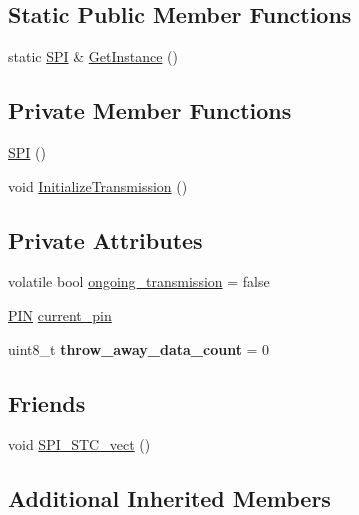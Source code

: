 \subsection*{Static Public Member Functions}
\begin{DoxyCompactItemize}
\item 
static \hyperlink{class_s_p_i___n_1_1_s_p_i}{S\+PI} \& \hyperlink{class_s_p_i___n_1_1_s_p_i_abc266ff9d817b8d4437d1da47fe8e7ae}{Get\+Instance} ()
\end{DoxyCompactItemize}
\subsection*{Private Member Functions}
\begin{DoxyCompactItemize}
\item 
\hyperlink{class_s_p_i___n_1_1_s_p_i_a8fec1a6e642a5758acf974b92e28a9e6}{S\+PI} ()
\item 
void \hyperlink{class_s_p_i___n_1_1_s_p_i_af973a5b4a970c3c01430037d578151ef}{Initialize\+Transmission} ()
\end{DoxyCompactItemize}
\subsection*{Private Attributes}
\begin{DoxyCompactItemize}
\item 
volatile bool \hyperlink{class_s_p_i___n_1_1_s_p_i_a89115bf64f31cd26d0b6ed3292decabb}{ongoing\+\_\+transmission} = false
\item 
\hyperlink{struct_s_p_i___n_1_1_p_i_n}{P\+IN} \hyperlink{class_s_p_i___n_1_1_s_p_i_ac016c4eaed2db3f8b5523bf0d472ddd2}{current\+\_\+pin}
\item 
\hypertarget{class_s_p_i___n_1_1_s_p_i_aaed8cc6f36275c3e33fcada1b9172742}{}\label{class_s_p_i___n_1_1_s_p_i_aaed8cc6f36275c3e33fcada1b9172742} 
uint8\+\_\+t {\bfseries throw\+\_\+away\+\_\+data\+\_\+count} = 0
\end{DoxyCompactItemize}
\subsection*{Friends}
\begin{DoxyCompactItemize}
\item 
void \hyperlink{class_s_p_i___n_1_1_s_p_i_a96543550133e0b0c6ae83faad5c0d68d}{S\+P\+I\+\_\+\+S\+T\+C\+\_\+vect} ()
\end{DoxyCompactItemize}
\subsection*{Additional Inherited Members}


